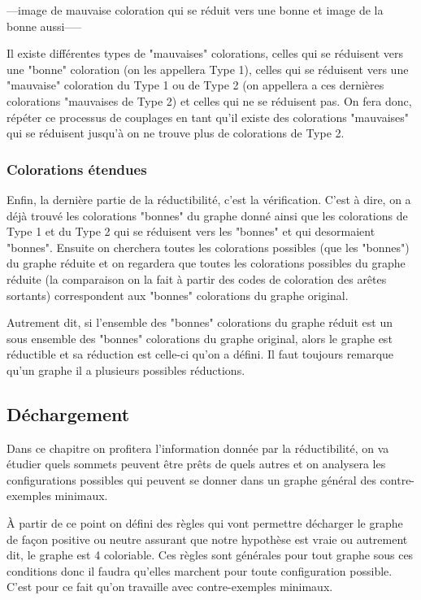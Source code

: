 \documentclass[10pt,a4paper]{article}
\begin{document}
---image de mauvaise coloration qui se réduit vers une bonne et image de la bonne aussi-----

Il existe différentes types de "mauvaises" colorations, celles qui se réduisent vers une "bonne" coloration (on les appellera Type 1), celles qui se réduisent vers une "mauvaise" coloration du Type 1 ou de Type 2 (on appellera a ces dernières colorations "mauvaises de Type 2) et celles qui ne se réduisent pas. On fera donc, répéter ce processus de couplages en tant qu'il existe des colorations "mauvaises" qui se réduisent jusqu'à on ne trouve plus de colorations de Type 2.

\subsubsection{Colorations étendues}

Enfin, la dernière partie de la réductibilité, c'est la vérification. C'est à dire, on a déjà trouvé les colorations "bonnes" du graphe donné ainsi que les colorations de Type 1 et du Type 2 qui se réduisent vers les "bonnes" et qui desormaient "bonnes". Ensuite on cherchera toutes les colorations possibles (que les "bonnes") du graphe réduite et on regardera que toutes les colorations possibles du graphe réduite (la comparaison on la fait à partir des codes de coloration des arêtes sortants) correspondent aux "bonnes" colorations du graphe original. 

Autrement dit, si l'ensemble des "bonnes" colorations du graphe réduit est un sous ensemble des "bonnes" colorations du graphe original, alors le graphe est réductible et sa réduction est celle-ci qu'on a défini. Il faut toujours remarque qu'un graphe il a plusieurs possibles réductions. 

\subsection{Déchargement}

Dans ce chapitre on profitera l'information donnée par la réductibilité, on va étudier quels sommets peuvent être prêts de quels autres et on analysera les configurations possibles qui peuvent se donner dans un graphe général des contre-exemples minimaux. 

À partir de ce point on défini des règles qui vont permettre décharger le graphe de façon positive ou neutre assurant que notre hypothèse est vraie ou autrement dit, le graphe est 4 coloriable. Ces règles sont générales pour tout graphe sous ces conditions donc il faudra qu'elles marchent pour toute configuration possible. C'est pour ce fait qu'on travaille avec contre-exemples minimaux. 
\end{document}
